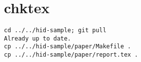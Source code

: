 \appendix
\section{chktex}
\begin{tiny}
\begin{verbatim}
cd ../../hid-sample; git pull
Already up to date.
cp ../../hid-sample/paper/Makefile .
cp ../../hid-sample/paper/report.tex .
\end{verbatim}
\end{tiny}
